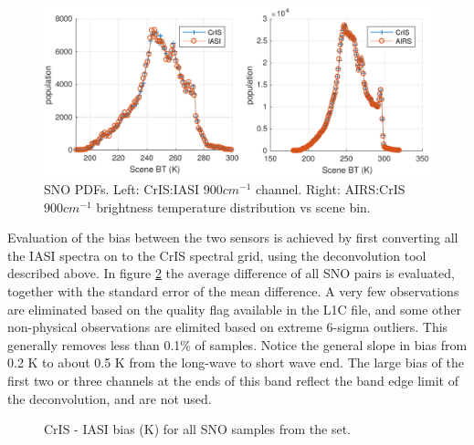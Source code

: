 \documentclass[twocolumn,10pt]{article}
\begin{document}
\begin{figure}[htb]
\centering
\includegraphics[width=\linewidth]{./figs/AC_IC_jplSNO_900wn_hist.pdf}
\caption{\label{fig:orgparagraph4}
  SNO PDFs. Left: CrIS:IASI $900 cm^{-1}$ channel. Right: AIRS:CrIS $900 cm^{-1}$ brightness temperature distribution vs scene bin.}
\label{fig:X2}
\end{figure}

Evaluation of the bias between the two sensors is achieved by first converting all the
IASI spectra on to the CrIS spectral grid, using the deconvolution tool described above.
In figure \ref{fig:X3} the average difference of all SNO pairs
is evaluated, together with the standard error of the mean difference. A very few
observations are eliminated based on the quality flag available in the L1C file, and some other non-physical observations are elimited based on extreme 6-sigma outliers. This generally removes less than  0.1\%  of samples. Notice the general slope in bias from 0.2 K to about 0.5 K from the long-wave to short wave end. The large bias of the first two or three channels at the ends of this band reflect the band edge limit of the deconvolution, and are not used.

\begin{figure}[htb]
  \centering
  \caption{CrIS - IASI bias (K) for all SNO samples from the set.}
  \label{fig:X3}
\end{figure}
\end{document}
